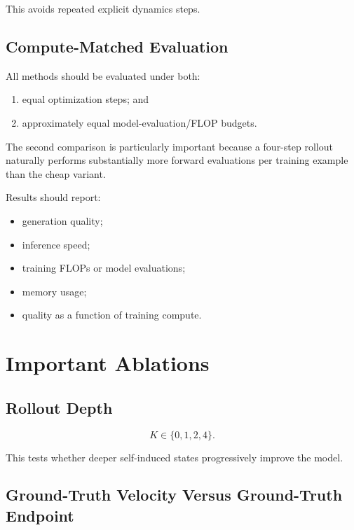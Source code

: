 \documentclass[11pt]{article}
\begin{document}
This avoids repeated explicit dynamics steps.

\subsection{Compute-Matched Evaluation}

All methods should be evaluated under both:

\begin{enumerate}[leftmargin=*]
    \item equal optimization steps; and
    \item approximately equal model-evaluation/FLOP budgets.
\end{enumerate}

The second comparison is particularly important because a four-step rollout
naturally performs substantially more forward evaluations per training example
than the cheap variant.

Results should report:

\begin{itemize}[leftmargin=*]
    \item generation quality;
    \item inference speed;
    \item training FLOPs or model evaluations;
    \item memory usage;
    \item quality as a function of training compute.
\end{itemize}

\section{Important Ablations}

\subsection{Rollout Depth}

\begin{equation}
K\in\{0,1,2,4\}.
\end{equation}

This tests whether deeper self-induced states progressively improve the model.

\subsection{Ground-Truth Velocity Versus Ground-Truth Endpoint}
\end{document}
